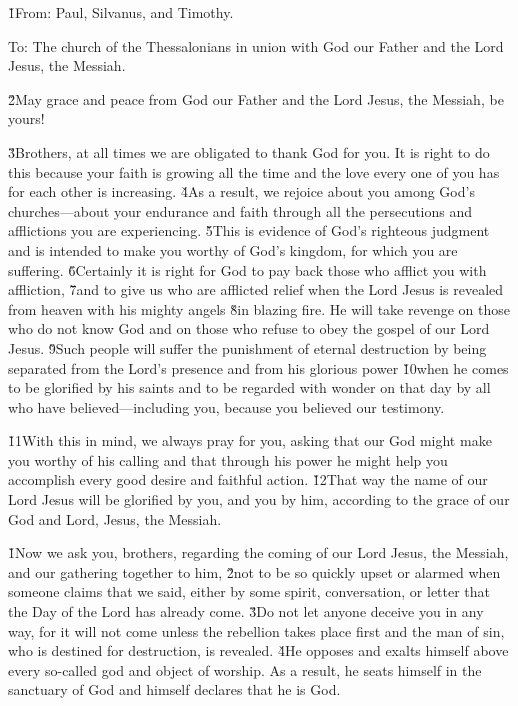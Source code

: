 


\v{1}From: Paul, Silvanus, and Timothy.

To: The church of the Thessalonians in union with God our Father and the Lord Jesus, the Messiah.

\v{2}May grace and peace from God our Father and the Lord Jesus, the Messiah, be yours!

\v{3}Brothers, at all times we are obligated to thank God for you. It is right to do this because your faith is growing all the time and the love every one of you has for each other is increasing. \v{4}As a result, we rejoice about you among God's churches---about your endurance and faith through all the persecutions and afflictions you are experiencing. \v{5}This is evidence of God's righteous judgment and is intended to make you worthy of God's kingdom, for which you are suffering. \v{6}Certainly it is right for God to pay back those who afflict you with affliction, \v{7}and to give us who are afflicted relief when the Lord Jesus is revealed from heaven with his mighty angels \v{8}in blazing fire. He will take revenge on those who do not know God and on those who refuse to obey the gospel of our Lord Jesus. \v{9}Such people will suffer the punishment of eternal destruction by being separated from the Lord's presence and from his glorious power \v{10}when he comes to be glorified by his saints and to be regarded with wonder on that day by all who have believed---including you, because you believed our testimony.

\v{11}With this in mind, we always pray for you, asking that our God might make you worthy of his calling and that through his power he might help you accomplish every good desire and faithful action. \v{12}That way the name of our Lord Jesus will be glorified by you, and you by him, according to the grace of our God and Lord, Jesus, the Messiah.

\v{1}Now we ask you, brothers, regarding the coming of our Lord Jesus, the Messiah, and our gathering together to him, \v{2}not to be so quickly upset or alarmed when someone claims that we said, either by some spirit, conversation, or letter that the Day of the Lord has already come. \v{3}Do not let anyone deceive you in any way, for it will not come unless the rebellion takes place first and the man of sin, who is destined for destruction, is revealed. \v{4}He opposes and exalts himself above every so-called god and object of worship. As a result, he seats himself in the sanctuary of God and himself declares that he is God.

